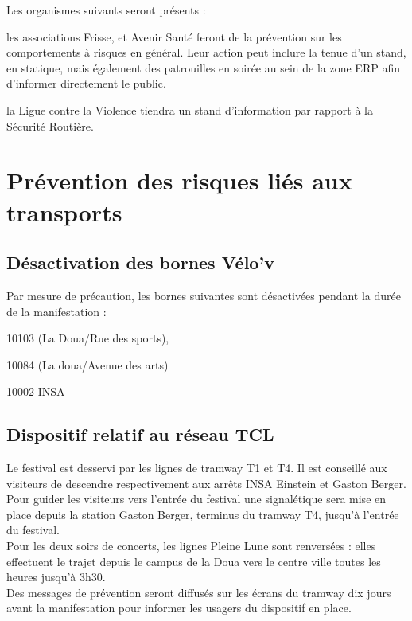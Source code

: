 \documentclass[hidelinks, paper=a4, fontsize=13pt]{report}
\begin{document}
Les organismes suivants seront présents :
\begin{list}{•}{}
\item les associations Frisse, et Avenir Santé feront de la prévention sur les comportements à risques en général. Leur action peut inclure la tenue d’un stand, en statique, mais également des patrouilles en soirée au sein de la zone ERP afin d'informer directement le public.
\item la Ligue contre la Violence tiendra un stand d’information par rapport à la Sécurité Routière.
\end{list}
\newpage
\section{Prévention des risques liés aux transports}

\subsection{Désactivation des bornes Vélo’v}

Par mesure de précaution, les bornes suivantes sont désactivées pendant la durée de la manifestation : 
\begin{list}{•}{}
\item 10103 (La Doua/Rue des sports), 
\item 10084 (La doua/Avenue des arts) 
\item 10002 INSA  
\end{list}

\subsection{Dispositif relatif au réseau TCL}


Le festival est desservi par les lignes de tramway T1 et T4. Il est conseillé aux visiteurs de descendre respectivement aux arrêts INSA Einstein et Gaston Berger. Pour guider les visiteurs vers l’entrée du festival une signalétique sera mise en place depuis la station Gaston Berger, terminus du tramway T4, jusqu’à l’entrée du festival.\\

Pour les deux soirs de concerts, les lignes Pleine Lune sont renversées : elles effectuent le trajet depuis le campus de la Doua vers le centre ville toutes les heures jusqu’à 3h30.\\

Des messages de prévention seront diffusés sur les écrans du tramway dix jours avant la manifestation pour informer  les usagers du dispositif en place.
\end{document}
